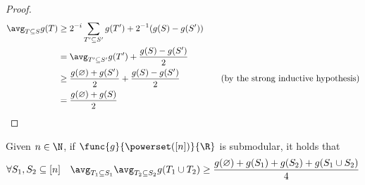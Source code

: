 \documentclass[a4paper, 12pt]{report}
\begin{document}
\begin{proof}
        \begin{equation*}
            \begin{alignedat}{2}
                \avg_{T \subseteq S}{g(T)} &\ge 2^{- i}\sum_{T' \subseteq S'}{g(T')} + 2^{-1}(g(S) - g(S')) && \\
                                           &= \avg_{T' \subseteq S'}{g(T')} + \dfrac{g(S) - g(S')}{2} && \\
                                           &\ge \dfrac{g(\varnothing) + g(S')}{2} + \dfrac{g(S) - g(S')}{2} && \quad \quad (\mathrm{by \ the \ strong \ inductive \ hypothesis}) \\
                                           &= \dfrac{g(\varnothing) + g(S)}{2}
            \end{alignedat}
        \end{equation*}
    \end{proof}

    \begin{framedlem}{}
        Given $n \in \N$, if $\func{g}{\powerset([n])}{\R}$ is submodular, it holds that $$\forall S_1, S_2 \subseteq [n] \quad \avg_{T_1 \subseteq S_1}{\avg_{T_2 \subseteq S_2}{g(T_1 \cup T_2)}} \ge \dfrac{g(\varnothing) + g(S_1) + g(S_2) + g(S_1 \cup S_2)}{4}$$
    \end{framedlem}
\end{document}
